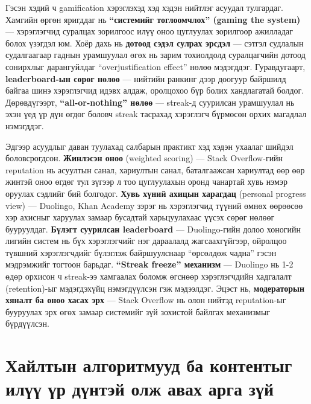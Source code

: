 Гэсэн хэдий ч gamification хэрэглэхэд хэд хэдэн нийтлэг асуудал тулгардаг. Хамгийн өргөн яригддаг нь \textbf{``системийг тоглоомчлох'' (gaming the system)} — хэрэглэгчид суралцах зорилгоос илүү оноо цуглуулах зорилгоор ажилладаг болох үзэгдэл юм. Хоёр дахь нь \textbf{дотоод сэдэл сулрах эрсдэл} — сэтгэл судлалын судалгаагаар гаднын урамшуулал өгөх нь зарим тохиолдолд суралцагчийн дотоод сонирхлыг дарангуйлдаг ``overjustification effect'' нөлөө мэдэгддэг. Гуравдугаарт, \textbf{leaderboard-ын сөрөг нөлөө} — нийтийн ранкинг дээр доогуур байршилд байгаа шинэ хэрэглэгчид идэвх алдаж, оролцохоо бүр болих хандлагатай болдог. Дөрөвдүгээрт, \textbf{``all-or-nothing'' нөлөө} — streak-д суурилсан урамшуулал нь эхэн үед үр дүн өгдөг боловч streak тасрахад хэрэглэгч бүрмөсөн орхих магадлал нэмэгддэг.

Эдгээр асуудлыг даван туулахад салбарын практикт хэд хэдэн ухаалаг шийдэл боловсрогдсон. \textbf{Жинлэсэн оноо} (weighted scoring) — Stack Overflow-гийн reputation нь асуултын санал, хариултын санал, баталгаажсан хариултад өөр өөр жинтэй оноо өгдөг тул зүгээр л тоо цуглуулахын оронд чанартай хувь нэмэр оруулах сэдлийг бий болгодог. \textbf{Хувь хүний ахицын харагдац} (personal progress view) — Duolingo, Khan Academy зэрэг нь хэрэглэгчид түүний өмнөх өөрөөсөө хэр ахисныг харуулах замаар бусадтай харьцуулахаас үүсэх сөрөг нөлөөг бууруулдаг. \textbf{Бүлэгт суурилсан leaderboard} — Duolingo-гийн долоо хоногийн лигийн систем нь бүх хэрэглэгчийг нэг дараалалд жагсаахгүйгээр, ойролцоо түвшний хэрэглэгчдийг бүлэглэж байршуулснаар ``өрсөлдөж чадна'' гэсэн мэдрэмжийг тогтоон барьдаг. \textbf{``Streak freeze'' механизм} — Duolingo нь 1-2 өдөр орхисон ч streak-ээ хамгаалах боломж өгснөөр хэрэглэгчдийн хадгалалт (retention)-ыг мэдэгдэхүйц нэмэгдүүлсэн гэж мэдээлдэг. Эцэст нь, \textbf{модераторын хяналт ба оноо хасах эрх} — Stack Overflow нь олон нийтэд reputation-ыг бууруулах эрх өгөх замаар системийг зүй зохистой байлгах механизмыг бүрдүүлсэн.


\section{Хайлтын алгоритмууд ба контентыг илүү үр дүнтэй олж авах арга зүй}


